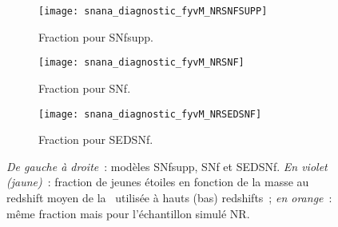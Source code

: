 \documentclass[../main/main.tex]{subfiles}
\begin{document}
\begin{landscape}
\begin{figure}[p]
    \centerfloat
    \vspace{-0.5cm}
    \begin{subfigure}[]{.30\linewidth}
        \centering
        \texttt{[image: snana\_diagnostic\_fyvM\_NRSNFSUPP]}
        \caption[Fraction pour SEDSNf]{Fraction pour SNfsupp.}
        \label{fig:fyvMsnfsupp}
    \end{subfigure}
    \centering
    \begin{subfigure}[]{.30\linewidth}
        \centering
        \texttt{[image: snana\_diagnostic\_fyvM\_NRSNF]}
        \caption[Fraction pour SEDSNf]{Fraction pour SNf.}
        \label{fig:fyvMsnf}
    \end{subfigure}
    \begin{subfigure}[]{.30\linewidth}
        \centering
        \texttt{[image: snana\_diagnostic\_fyvM\_NRSEDSNF]}
        \caption[Fraction pour SEDSNf]{Fraction pour SEDSNf.}
        \label{fig:fyvMsed}
    \end{subfigure}
    \caption[Évolution de la fraction de jeunes étoiles en fonction de la masse
    pour les différents modèles de masse]{\textit{De gauche à droite}~: modèles
        SNfsupp, SNf et SEDSNf. \textit{En violet (jaune)}~: fraction de jeunes
        étoiles en fonction de la masse au redshift moyen de la \hostlib\
        utilisée à hauts (bas) redshifts~; \textit{en orange}~: même fraction
    mais pour l'échantillon simulé NR.}
    \label{fig:fyvM}
\end{figure}


\end{landscape}
\end{document}
